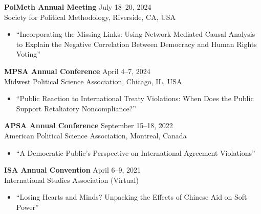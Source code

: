 \documentclass[11pt, letterpaper]{article}
\begin{document}
\vspace{-2mm}
\textbf{PolMeth Annual Meeting} \hfill July 18--20, 2024\\
Society for Political Methodology, Riverside, CA, USA
\begin{itemize}
\vspace{-2mm}
    \item ``Incorporating the Missing Links: Using Network-Mediated Causal Analysis to Explain the Negative Correlation Between Democracy and Human Rights Voting''
\end{itemize}

\vspace{-2mm}
\textbf{MPSA Annual Conference} \hfill April 4--7, 2024\\
Midwest Political Science Association, Chicago, IL, USA
\begin{itemize}
\vspace{-2mm}
    \item ``Public Reaction to International Treaty Violations: When Does the Public Support Retaliatory Noncompliance?''
\end{itemize}

\vspace{-2mm}
\textbf{APSA Annual Conference} \hfill September 15--18, 2022\\
American Political Science Association, Montreal, Canada
\begin{itemize}
\vspace{-2mm}
    \item ``A Democratic Public’s Perspective on International Agreement Violations''
\end{itemize}

\vspace{-2mm}
\textbf{ISA Annual Convention} \hfill April 6--9, 2021\\
International Studies Association (Virtual)
\vspace{-2mm}
\begin{itemize}
    \item ``Losing Hearts and Minds? Unpacking the Effects of Chinese Aid on Soft Power''
\end{itemize}



\end{document}
